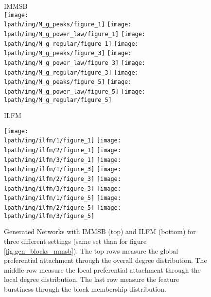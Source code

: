 \begin{figure*}[ht]
	\centering IMMSB\\
	\texttt{[image: \\lpath/img/M\_g\_peaks/figure\_1]}
	\endminipage
	\texttt{[image: \\lpath/img/M\_g\_power\_law/figure\_1]}
	\endminipage
	\texttt{[image: \\lpath/img/M\_g\_regular/figure\_1]}
	\endminipage
		\vspace{-0.29cm}
	\texttt{[image: \\lpath/img/M\_g\_peaks/figure\_3]}
	\endminipage
	\texttt{[image: \\lpath/img/M\_g\_power\_law/figure\_3]} 
	\endminipage
	\texttt{[image: \\lpath/img/M\_g\_regular/figure\_3]}
	\endminipage
		\vspace{-0.28cm}
	\texttt{[image: \\lpath/img/M\_g\_peaks/figure\_5]}
	\endminipage
	\texttt{[image: \\lpath/img/M\_g\_power\_law/figure\_5]} 
	\endminipage
	\texttt{[image: \\lpath/img/M\_g\_regular/figure\_5]}
	\endminipage

    \vspace{0.2cm}
	 ILFM

	\texttt{[image: \\lpath/img/ilfm/1/figure\_1]}
	\endminipage
	\texttt{[image: \\lpath/img/ilfm/2/figure\_1]}
	\endminipage
	\texttt{[image: \\lpath/img/ilfm/3/figure\_1]}
	\endminipage
		\vspace{-0.29cm}
	\texttt{[image: \\lpath/img/ilfm/1/figure\_3]}
	\endminipage
	\texttt{[image: \\lpath/img/ilfm/2/figure\_3]} 
	\endminipage
	\texttt{[image: \\lpath/img/ilfm/3/figure\_3]}
	\endminipage
		\vspace{-0.28cm}
	\texttt{[image: \\lpath/img/ilfm/1/figure\_5]}
	\endminipage
	\texttt{[image: \\lpath/img/ilfm/2/figure\_5]} 
	\endminipage
	\texttt{[image: \\lpath/img/ilfm/3/figure\_5]}
	\endminipage
    \caption{Generated Networks with IMMSB (top) and ILFM (bottom) for three different settings (same set than for figure \ref{fig:gen_blocks_mmsb}). The top rows measure the global preferential attachment through the overall degree distribution. The middle row measure the local preferential attachment through the local degree distribution. The last row measure the feature burstiness through the block membership distribution.}
	\label{fig:gen_burst}
\end{figure*}

